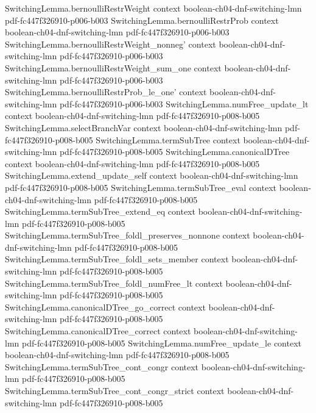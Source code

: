 \begin{theorem}
  {SwitchingLemma.bernoulliRestrWeight}
  {context}
  {boolean-ch04-dnf-switching-lmn}
  {pdf-fc447f326910-p006-b003}
\proofstep
  {SwitchingLemma.bernoulliRestrProb}
  {context}
  {boolean-ch04-dnf-switching-lmn}
  {pdf-fc447f326910-p006-b003}
\proofstep
  {SwitchingLemma.bernoulliRestrWeight_nonneg'}
  {context}
  {boolean-ch04-dnf-switching-lmn}
  {pdf-fc447f326910-p006-b003}
\proofstep
  {SwitchingLemma.bernoulliRestrWeight_sum_one}
  {context}
  {boolean-ch04-dnf-switching-lmn}
  {pdf-fc447f326910-p006-b003}
\proofstep
  {SwitchingLemma.bernoulliRestrProb_le_one'}
  {context}
  {boolean-ch04-dnf-switching-lmn}
  {pdf-fc447f326910-p006-b003}
\proofstep
  {SwitchingLemma.numFree_update_lt}
  {context}
  {boolean-ch04-dnf-switching-lmn}
  {pdf-fc447f326910-p008-b005}
\proofstep
  {SwitchingLemma.selectBranchVar}
  {context}
  {boolean-ch04-dnf-switching-lmn}
  {pdf-fc447f326910-p008-b005}
\proofstep
  {SwitchingLemma.termSubTree}
  {context}
  {boolean-ch04-dnf-switching-lmn}
  {pdf-fc447f326910-p008-b005}
\proofstep
  {SwitchingLemma.canonicalDTree}
  {context}
  {boolean-ch04-dnf-switching-lmn}
  {pdf-fc447f326910-p008-b005}
\proofstep
  {SwitchingLemma.extend_update_self}
  {context}
  {boolean-ch04-dnf-switching-lmn}
  {pdf-fc447f326910-p008-b005}
\proofstep
  {SwitchingLemma.termSubTree_eval}
  {context}
  {boolean-ch04-dnf-switching-lmn}
  {pdf-fc447f326910-p008-b005}
\proofstep
  {SwitchingLemma.termSubTree_extend_eq}
  {context}
  {boolean-ch04-dnf-switching-lmn}
  {pdf-fc447f326910-p008-b005}
\proofstep
  {SwitchingLemma.termSubTree_foldl_preserves_nonnone}
  {context}
  {boolean-ch04-dnf-switching-lmn}
  {pdf-fc447f326910-p008-b005}
\proofstep
  {SwitchingLemma.termSubTree_foldl_sets_member}
  {context}
  {boolean-ch04-dnf-switching-lmn}
  {pdf-fc447f326910-p008-b005}
\proofstep
  {SwitchingLemma.termSubTree_foldl_numFree_lt}
  {context}
  {boolean-ch04-dnf-switching-lmn}
  {pdf-fc447f326910-p008-b005}
\proofstep
  {SwitchingLemma.canonicalDTree_go_correct}
  {context}
  {boolean-ch04-dnf-switching-lmn}
  {pdf-fc447f326910-p008-b005}
\proofstep
  {SwitchingLemma.canonicalDTree_correct}
  {context}
  {boolean-ch04-dnf-switching-lmn}
  {pdf-fc447f326910-p008-b005}
\proofstep
  {SwitchingLemma.numFree_update_le}
  {context}
  {boolean-ch04-dnf-switching-lmn}
  {pdf-fc447f326910-p008-b005}
\proofstep
  {SwitchingLemma.termSubTree_cont_congr}
  {context}
  {boolean-ch04-dnf-switching-lmn}
  {pdf-fc447f326910-p008-b005}
\proofstep
  {SwitchingLemma.termSubTree_cont_congr_strict}
  {context}
  {boolean-ch04-dnf-switching-lmn}
  {pdf-fc447f326910-p008-b005}

\end{theorem}
